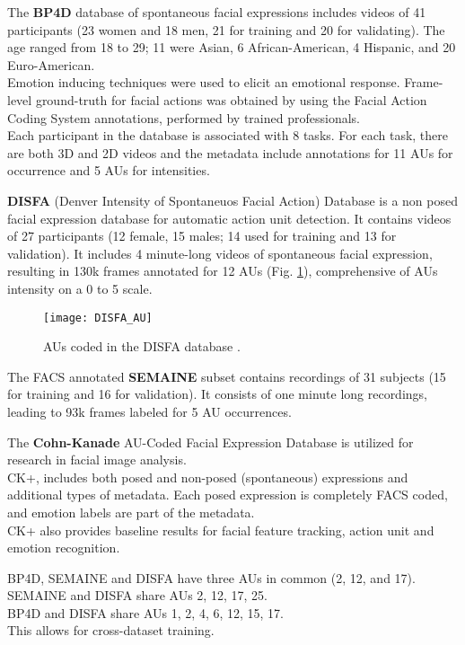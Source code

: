 The \textbf{BP4D} database of spontaneous facial expressions includes videos of 41 participants (23 women and 18 men, 21 for training and 20 for validating). The age ranged from 18 to 29; 11 were Asian, 6 African-American, 4 Hispanic, and 20 Euro-American. \\
Emotion inducing techniques were used to elicit an emotional response. Frame-level ground-truth for facial actions was obtained by using the Facial Action Coding System annotations, performed by trained professionals. \\
Each participant in the database is associated with 8 tasks. For each task, there are both 3D and 2D videos and the metadata include annotations for 11 AUs for occurrence and 5 AUs for intensities.

\textbf{DISFA} (Denver Intensity of Spontaneuos Facial Action) Database is a non posed facial expression database for automatic action unit detection. It contains videos of 27 participants (12 female, 15 males; 14 used for training and 13 for validation). It includes 4 minute-long videos of spontaneous facial expression, resulting in 130k frames annotated for 12 AUs (Fig. \ref{fig:DISFA_AU}), comprehensive of AUs intensity on a 0 to 5 scale.

\begin{figure}[H]
	\centering
	\texttt{[image: DISFA\_AU]}
	\caption{AUs coded in the DISFA database \cite{DISFA_AU}.}
	\label{fig:DISFA_AU}
\end{figure}

The FACS annotated \textbf{SEMAINE} subset contains recordings of 31 subjects (15 for training and 16 for validation). It consists of one minute long recordings, leading to 93k frames labeled for 5 AU occurrences.

The \textbf{Cohn-Kanade} AU-Coded Facial Expression Database is utilized for research in facial image analysis. \\
CK+, includes both posed and non-posed (spontaneous) expressions and additional types of metadata. Each posed expression is completely FACS coded, and emotion labels are part of the metadata. \\
CK+ also provides baseline results for facial feature tracking, action unit and emotion recognition.

BP4D, SEMAINE and DISFA have three AUs in common (2, 12, and 17). \\
SEMAINE and DISFA share AUs 2, 12, 17, 25. \\
BP4D and DISFA share AUs 1, 2, 4, 6, 12, 15, 17. \\
This allows for cross-dataset training.

